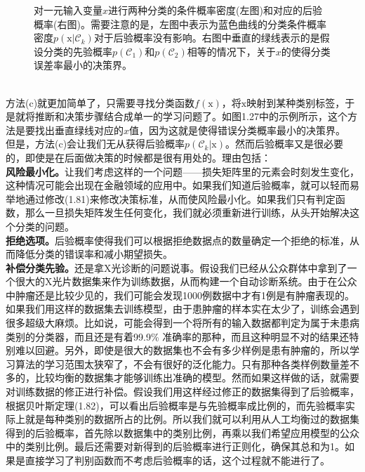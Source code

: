 \documentclass[b5paper]{book}
\numberwithin{equation}{chapter}
\begin{document}
{\begin{figure}[ht]
\begin{minipage}[t]{0.5\linewidth}
		\label{fig:1-27b}
		\end{minipage} 
		\caption{对一元输入变量$x$进行两种分类的条件概率密度(左图)和对应的后验概率(右图)。需要注意的是，左图中表示为蓝色曲线的分类条件概率密度$p(\boldsymbol{\mathrm{x}}|\mathcal{C}_k)$对于后验概率没有影响。右图中垂直的绿线表示的是假设分类的先验概率$p(\mathcal{C}_1)$和$p(\mathcal{C}_2)$相等的情况下，关于$x$的使得分类误差率最小的决策界。}
	\end{figure}
	\\
	\indent 方法(c)就更加简单了，只需要寻找分类函数$f(\boldsymbol{\mathrm{x}})$，将$\boldsymbol{\mathrm{x}}$映射到某种类别标签，于是就将推断和决策步骤结合成单一的学习问题了。如图1.27中的示例所示，这个方法是要找出垂直绿线对应的$x$值，因为这就是使得错误分类概率最小的决策界。\\
	\indent 但是，方法(c)会让我们无从获得后验概率$p(\mathcal{C}_k|\boldsymbol{\mathrm{x}})$。然而后验概率又是很必要的，即使是在后面做决策的时候都是很有用处的。理由包括：\\
	\indent \textbf{风险最小化。}让我们考虑这样的一个问题——损失矩阵里的元素会时刻发生变化，这种情况可能会出现在金融领域的应用中。如果我们知道后验概率，就可以轻而易举地通过修改(1.81)来修改决策标准，从而使风险最小化。如果我们只有判定函数，那么一旦损失矩阵发生任何变化，我们就必须重新进行训练，从头开始解决这个分类的问题。\\
	\indent \textbf{拒绝选项。}后验概率使得我们可以根据拒绝数据点的数量确定一个拒绝的标准，从而降低分类的错误率和减小期望损失。\\
	\indent \textbf{补偿分类先验。}还是拿X光诊断的问题说事。假设我们已经从公众群体中拿到了一个很大的X光片数据集来作为训练数据，从而构建一个自动诊断系统。由于在公众中肿瘤还是比较少见的，我们可能会发现1000例数据中才有1例是有肿瘤表现的。如果我们用这样的数据集去训练模型，由于患肿瘤的样本实在太少了，训练会遇到很多超级大麻烦。比如说，可能会得到一个将所有的输入数据都判定为属于未患病类别的分类器，而且还是有着99.9\% 准确率的那种，而且这种明显不对的结果还特别难以回避。另外，即使是很大的数据集也不会有多少样例是患有肿瘤的，所以学习算法的学习范围太狭窄了，不会有很好的泛化能力。只有那种各类样例数量差不多的，比较均衡的数据集才能够训练出准确的模型。然而如果这样做的话，就需要对训练数据的修正进行补偿。假设我们用这样经过修正的数据集得到了后验概率，根据贝叶斯定理(1.82)，可以看出后验概率是与先验概率成比例的，而先验概率实际上就是每种类别的数据所占的比例。所以我们就可以利用从人工均衡过的数据集得到的后验概率，首先除以数据集中的类别比例，再乘以我们希望应用模型的公众中的类别比例。最后还需要对新得到的后验概率进行正则化，确保其总和为1。如果是直接学习了判别函数而不考虑后验概率的话，这个过程就不能进行了。\\
}
\end{document}
